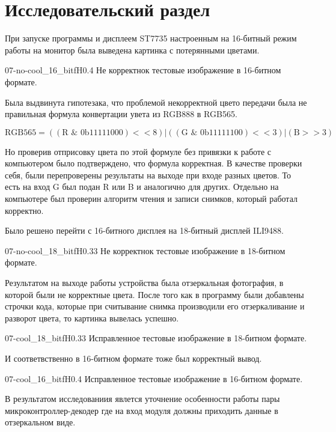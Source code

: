 \chapter{Исследовательский раздел}


	При запуске программы и дисплеем ST7735 настроенным на 16-битный режим работы на монитор была выведена картинка с потерянными цветами.
	
	{07-no-cool_16_bit}{f}{H}{0.4\textwidth}
	{Не корректнок тестовые изображение в 16-битном формате.} %
	
	Была выдвинута гипотезака, что проблемой некорректной цвето передачи была не правильная формула конвертации увета из RGB888 в RGB565.
	
	\[\text{RGB565} = ((\text{R } \& \text{ 0b}11111000) << 8) | ((\text{G } \& \text{ 0b}11111100) << 3) | (\text{B} >> 3)\]
	
	Но проверив отприсовку цвета по этой формуле без привязки к работе с компьютером было подтверждено, что формула корректная. В качестве проверки себя, были перепроверены результаты на выходе при входе разных цветов. То есть на вход G был подан R или B и аналогично для других. Отдельно на компьютере был проверин алгоритм чтения и записи снимков, который работал корректно.
	
	Было решено перейти с 16-битного дисплея на 18-битный дисплей ILI9488.
	
	{07-no-cool_18_bit}{f}{H}{0.33\textwidth}
	{Не корректнок тестовые изображение в 18-битном формате.} %
	
	Результатом на выходе работы устройства была отзеркальная фотография, в которой были не корректные цвета. После того как в программу были добавлены строчки кода, которые при считывание снимка производили его отзеркаливание и разворот цвета, то картинка вывелась успешно.
	
	{07-cool_18_bit}{f}{H}{0.33\textwidth}
	{Исправленное тестовые изображение в 18-битном формате.} %
	
	И соответвственно в 16-битном формате тоже был корректный вывод.
	
	{07-cool_16_bit}{f}{H}{0.4\textwidth}
	{Исправленное тестовые изображение в 16-битном формате.} %
	
	В результатом исследованиия явлется уточнение особенности работы пары микроконтроллер-декодер где на вход модуля должны приходить данные в отзеркальном виде.
	
	